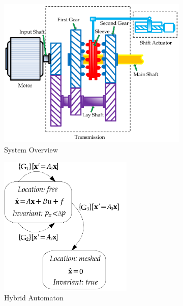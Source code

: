 
\begin{figure}[t]
\begin{subfigure}{0.3\textwidth}
\centering
    \includegraphics[width=1.0\textwidth]{images/gb_overview1.png}
    \caption{System Overview}\label{fig:gbo_1}
\end{subfigure}
\begin{subfigure}{0.3\textwidth}
\centering
    \includegraphics[width=0.7\textwidth]{images/gb_overview2.png}
    \caption{Hybrid Automaton}\label{fig:gbo_2}
\end{subfigure}
\begin{subfigure}{0.3\textwidth}

\end{subfigure}
\end{figure}
